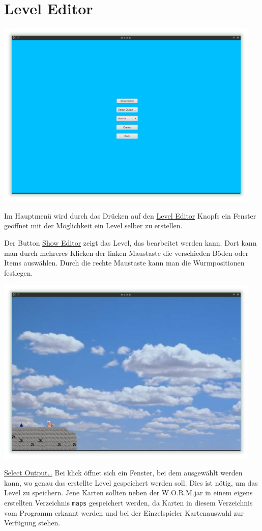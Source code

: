 \documentclass{scrreprt}
\begin{document}
\chapter{Level Editor}

\includegraphics[height=9cm]{Screenshot3.png}

Im Hauptmenü wird durch das Drücken auf den \underline{Level Editor} Knopfs ein Fenster geöffnet mit der Möglichkeit ein Level selber zu erstellen.

Der Button \underline{Show Editor} zeigt das Level, das bearbeitet werden kann. Dort kann man durch mehreres Klicken der linken
Maustaste die verschieden Böden oder Items auswählen. Durch die rechte Maustaste kann man die Wurmpositionen festlegen.

\includegraphics[height=9cm]{Screenshot4.jpg}

\underline{Select Output…} Bei klick öffnet sich ein Fenster, bei dem ausgewählt werden kann, wo genau das erstellte Level
gespeichert werden soll. Dies ist nötig, um das Level zu speichern. Jene Karten sollten neben der W.O.R.M.jar in einem eigens
erstellten Verzeichnis \texttt{maps} gespeichert werden, da Karten in diesem Verzeichnis vom Programm erkannt werden und bei der
Einzelspieler Kartenauswahl zur Verfügung stehen.
\end{document}
